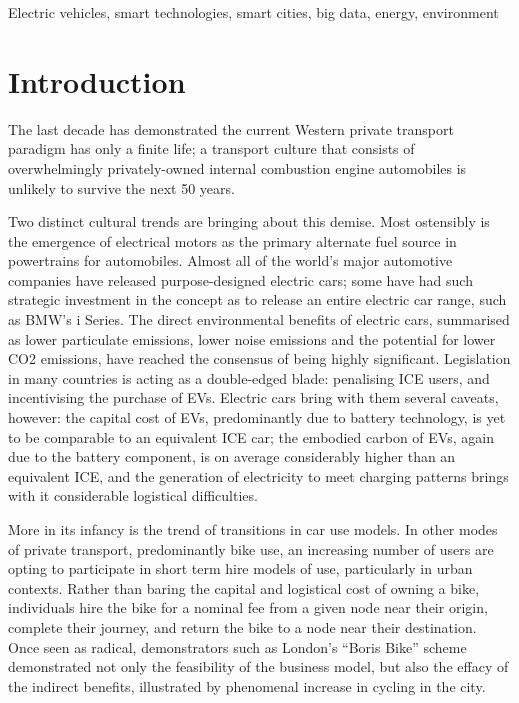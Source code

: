 \documentclass[conference]{IEEEtran}
\begin{document}
%

\begin{IEEEkeywords}
Electric vehicles, smart technologies, smart cities, big data, energy,
environment
\end{IEEEkeywords}

\section{Introduction}

The last decade has demonstrated the current Western private transport
paradigm has only a finite life; a transport culture that consists of
overwhelmingly privately-owned internal combustion engine automobiles
is unlikely to survive the next 50 years.

Two distinct cultural trends are bringing about this demise. Most
ostensibly is the emergence of electrical motors as the primary
alternate fuel source in powertrains for automobiles. Almost all of
the world’s major automotive companies have released purpose-designed
electric cars; some have had such strategic investment in the concept
as to release an entire electric car range, such as BMW's i
Series. The direct environmental benefits of electric cars, summarised
as lower particulate emissions, lower noise emissions and the
potential for lower CO2 emissions, have reached the consensus of
being highly significant. Legislation in many countries is acting as a
double-edged blade: penalising ICE users, and incentivising the
purchase of EVs. Electric cars bring with them several caveats,
however: the capital cost of EVs, predominantly due to battery
technology, is yet to be comparable to an equivalent ICE car; the
embodied carbon of EVs, again due to the battery component, is on
average considerably higher than an equivalent ICE, and the generation
of electricity to meet charging patterns brings with it considerable
logistical difficulties.

More in its infancy is the trend of transitions in car use models. In
other modes of private transport, predominantly bike use, an
increasing number of users are opting to participate in short term
hire models of use, particularly in urban contexts. Rather than baring
the capital and logistical cost of owning a bike, individuals hire the
bike for a nominal fee from a given node near their origin, complete
their journey, and return the bike to a node near their
destination. Once seen as radical, demonstrators such as London’s
``Boris Bike'' scheme demonstrated not only the feasibility of the
business model, but also the effacy of the indirect benefits,
illustrated by phenomenal increase in cycling in the city. 
\end{document}
